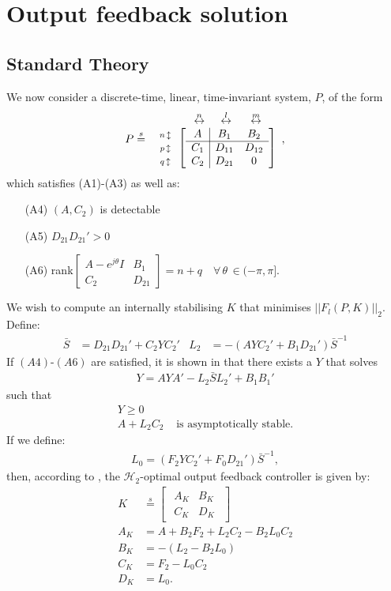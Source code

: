 \documentclass[a4paper,12pt]{article}
\theoremstyle{remark}
\newcommand{\arr}[2]{
        \begin{array}{#1}
        #2
        \end{array}}
\newcommand{\shorteq}{\stackrel{s}{=}}
\newcommand{\nrm}[1]{\left|\left| #1 \right|\right|}
\newcommand{\ma}[1]{\begin{bmatrix} #1 \end{bmatrix}}
\newcommand{\als}[1]{\begin{align*} #1 \end{align*}}
\newcommand{\aln}[1]{\begin{align} #1 \end{align}}
\newcommand{\htwo}{\mathcal H_2}
\begin{document}
\section{Output feedback solution}
\label{sec:H2OF}
\subsection{Standard Theory}
\label{subsec:stdH2OF}
We now consider a discrete-time, linear, time-invariant system, $P$, of the form $$P \shorteq \arr{c}{\hspace{0.8cm}\stackrel{n}{\leftrightarrow}\hspace{0.5cm}\stackrel{l}{\leftrightarrow}\hspace{0.6cm}\stackrel{m}{\leftrightarrow} \\\arr{c}{\scriptstyle{n} \,\updownarrow\\\scriptstyle{p} \,\updownarrow\\\scriptstyle{q} \,\updownarrow} \ma{\arr{c|cc}{ A&B_1&B_2\\\hline C_1&D_{11}&D_{12}\\C_2&D_{21}&0}}},$$
which satisfies (A1)-(A3) as well as:
\begin{itemize}
\item[(A4)] $(A,C_2)$ is detectable 
\item[(A5)] $D_{21}D_{21}'>0$
\item[(A6)] rank$\ma{A-e^{j\theta}I&B_1\\C_2& D_{21}}=n+q\quad \forall\, \theta \,\in (-\pi,\pi]$.
\end{itemize}
%
We wish to compute an internally stabilising $K$ that minimises $\nrm{F_l(P,K)}_2$. Define:
\als{
    \bar S&=D_{21}D_{21}'+C_2YC_2' &  L_2&=-(AYC_2'+B_1D_{21}')\bar S^{-1}
}
%
If $(A4)$-$(A6)$ are satisfied, it is shown in \cite{ZDG} that there exists a $Y$ that solves
\aln{
Y=AYA'-L_2 {\bar S}L_2'+B_1B_1'
\label{eqn:Y2d}
}
such that 
\als{
Y\geq 0\\
A+L_2C_2 &\textrm{ is asymptotically stable}.
}
If we define: 
\als{
L_0=(F_2YC_2'+F_0D_{21}'){\bar S}^{-1},
}
then, according to \cite{ZDG}, the $\htwo$-optimal output feedback controller is given by:
\aln{
K& \shorteq \ma{\arr{c|c}{A_K&B_K\\ \hline C_K &D_K}} \label{eqn:H2OptK}\\ 
A_K&=A+B_2F_2+L_2C_2-B_2L_0C_2\\
B_K&=-(L_2-B_2L_0)\\
C_K&=F_2-L_0C_2\\
D_K&=L_0.}
\end{document}
